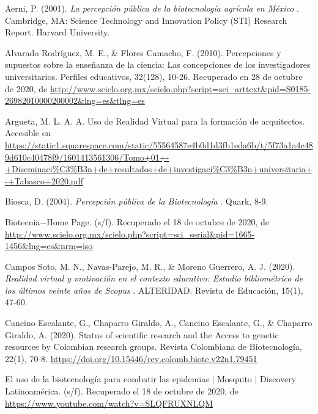 \documentclass[12pt]{article}
\begin{document}
\newpage
{}
\begin{thebibliography}{X}
	
	Aerni, P. (2001). \textit{ La percepción pública de la biotecnología agrícola en México }. Cambridge, MA: Science Technology and Innovation Policy (STI) Research Report. Harvard University.

	\bibitem[Alvarado, 2010]{} Alvarado Rodríguez, M. E., \& Flores Camacho, F. (2010). Percepciones y supuestos sobre la enseñanza de la ciencia: Las concepciones de los investigadores universitarios. Perfiles educativos, 32(128), 10-26. Recuperado en 28 de octubre de 2020, de \url{http://www.scielo.org.mx/scielo.php?script=sci_arttext&pid=S0185-26982010000200002&lng=es&tlng=es}

	 Argueta, M. L. A. A. Uso de Realidad Virtual para la formación de arquitectos. Accesible en \url{https://static1.squarespace.com/static/55564587e4b0d1d3fb1eda6b/t/5f73a1a4c489d610c40478f9/1601413561306/Tomo+01+-+Diseminaci%C3%B3n+de+resultados+de+investigaci%C3%B3n+universitaria+-+Tabasco+2020.pdf}
	
	 Biosca, D. (2004). \textit{ Percepción pública de la Biotecnología }. Quark, 8-9.
	
	 Biotecnia$-$Home Page. (s/f). Recuperado el 18 de octubre de 2020, de \url{http://www.scielo.org.mx/scielo.php?script=sci_serial&pid=1665-1456&lng=es&nrm=iso}
	
	 Campos Soto, M. N., Navas-Parejo, M. R., \& Moreno Guerrero, A. J. (2020). \textit{ Realidad virtual y motivación en el contexto educativo: Estudio bibliométrico de los últimos veinte años de Scopus }. ALTERIDAD. Revista de Educación, 15(1), 47-60.

	 Cancino Escalante, G., Chaparro Giraldo, A., Cancino Escalante, G., \& Chaparro Giraldo, A. (2020). Status of scientific research and the Access to genetic resources by Colombian research groups. Revista Colombiana de Biotecnología, 22(1), 70-8. \url{https://doi.org/10.15446/rev.colomb.biote.v22n1.79451}

	 El uso de la biotecnología para combatir las epidemias $|$ Mosquito $|$ Discovery Latinoamérica. (s/f). Recuperado el 18 de octubre de 2020, de \url{https://www.youtube.com/watch?v=SLQFRUXNLQM}
	

\end{thebibliography}
\end{document}

